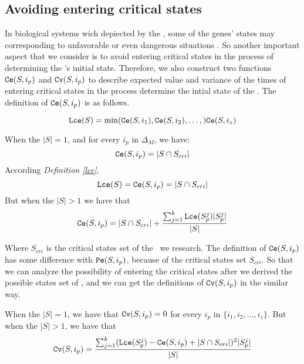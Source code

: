 \subsection{Avoiding entering critical states}
In biological systems wich depiected by the \BCNs, some of the genes' states may corresponding to unfavorable or even dangerous situations \cite{Li2014Controllability}. So another important aspect that we consider is to avoid entering critical states in the process of determining the \BCN's initial state. Therefore, we also construct two functions $\Ce(S, i_p)$ and $\Cv(S, i_p)$ to describe expected value and variance of the times of entering critical states in the process determine the intial state of the \BCNs. The definition of $\Ce(S, i_p)$ is as follows.\\
\begin{definition}[$\Lce(S)$] \label{lce}
\[{\tt Lce}(S)= \min({\tt Ce}(S, i_1),{\tt Ce}(S, i_2),\ldots,){\tt Ce}(S, i_z)\]
\end{definition}
\begin{definition}[$\Ce(S, i_p)$] 
When the $|S|=1$, and for every $i_p$ in $\Delta_M$, we have: \[{\tt Ce}(S, i_p)=|S \cap S_{cri} |\] 
According {\em Definition \ref{lce}}, %
\[{\tt Lce}(S)={\tt Ce}(S, i_p)=|S \cap S_{cri} |\] 
But when the $|S|>1$ 
we have that 
\[{\tt Ce}(S, i_p)=|S \cap S_{cri}| +\frac{\sum_{j=1}^k {\tt Lce}(S_p^j)|S_p^j|}{ |S|} \] 
\end{definition}

Where $S_{cri}$ is the critical states set of the \BCN\ we research. The definition of $\Ce(S, i_p)$ has some difference with ${\tt Pe}(S, i_p)$, because of the critical states set $S_{cri}$. So that  we can analyze the possibility of entering the  critical states after we derived the possible states set of \BCNs, and we can get the definitions of $\Cv(S, i_p)$ in the similar way. %

\begin{definition}[$\Cv(S, i_p)$] 
When the $|S|=1$, we have that
${\tt Cv}(S, i_p)=0$  for every $i_p$ in $\{i_1,i_2,\ldots, i_z\}$. But when the $|S|>1$, 
we have that  
\[{\tt Cv}(S, i_p)=\frac{\sum_{j=1}^k ({\tt Lce}(S_p^j)-{\tt Ce}(S, i_p)+|S \cap S_{cri}|)^2 |S_p^j|}{ |S|}\] 
\end{definition}


